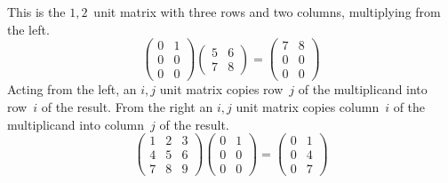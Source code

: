 \begin{example}
This is the \( 1,2\, \) unit matrix with three rows and two columns,
multiplying from the left.
\begin{equation*}
    \begin{pmatrix}
       0  &1  \\
       0  &0  \\
       0  &0
    \end{pmatrix}
    \begin{pmatrix}
       5  &6  \\
       7  &8
    \end{pmatrix}
  =
    \begin{pmatrix}
       7  &8  \\
       0  &0  \\
       0  &0
    \end{pmatrix}
\end{equation*}
Acting
from the left, an \( i,j \) unit matrix copies row~\( j \) of
the multiplicand into row~\( i \) of the result.
From the right an \( i,j \) unit matrix copies column~\( i \) of
the multiplicand into column~\( j \) of the result.
\begin{equation*}
    \begin{pmatrix}
       1  &2  &3  \\
       4  &5  &6  \\
       7  &8  &9
    \end{pmatrix}
    \begin{pmatrix}
       0  &1  \\
       0  &0  \\
       0  &0
    \end{pmatrix}
  =
    \begin{pmatrix}
       0  &1  \\
       0  &4  \\
       0  &7
    \end{pmatrix}
\end{equation*}
\end{example}

